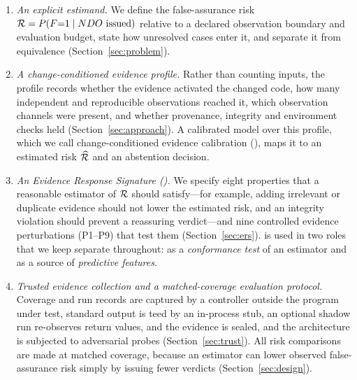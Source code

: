\begin{enumerate}
\item \emph{An explicit estimand.} We define the false-assurance risk $\mathcal{R} = P(F{=}1 \mid NDO{}\text{ issued})$ relative to a declared observation boundary and evaluation budget, state how unresolved cases enter it, and separate it from equivalence (Section~\ref{sec:problem}).
\item \emph{A change-conditioned evidence profile.} Rather than counting inputs, the profile records whether the evidence activated the changed code, how many independent and reproducible observations reached it, which observation channels were present, and whether provenance, integrity and environment checks held (Section~\ref{sec:approach}). A calibrated model over this profile, which we call change-conditioned evidence calibration (\cec{}), maps it to an estimated risk $\widehat{\mathcal{R}}$ and an abstention decision.
\item \emph{An Evidence Response Signature (\ers{}).} We specify eight properties that a reasonable estimator of $\mathcal{R}$ should satisfy---for example, adding irrelevant or duplicate evidence should not lower the estimated risk, and an integrity violation should prevent a reassuring verdict---and nine controlled evidence perturbations (P1--P9) that test them (Section~\ref{sec:ers}). \ers{} is used in two roles that we keep separate throughout: as a \emph{conformance test} of an estimator and as a source of \emph{predictive features}.
\item \emph{Trusted evidence collection and a matched-coverage evaluation protocol.} Coverage and run records are captured by a controller outside the program under test, standard output is teed by an in-process stub, an optional shadow run re-observes return values, and the evidence is sealed, and the architecture is subjected to adversarial probes (Section~\ref{sec:trust}). All risk comparisons are made at matched coverage, because an estimator can lower observed false-assurance risk simply by issuing fewer verdicts (Section~\ref{sec:design}).
\end{enumerate}

